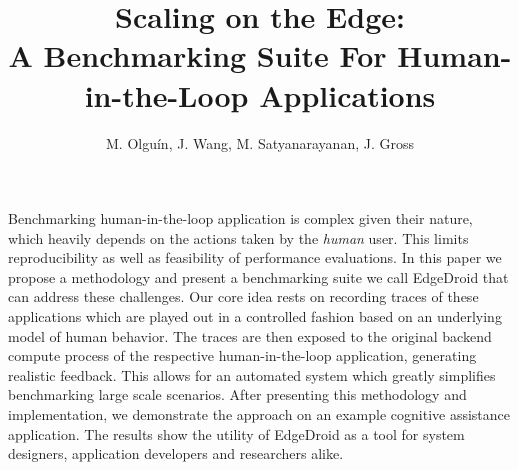 \documentclass[portrait, a1]{KTHEEposter}
\begin{document}
    
    \title{\LARGE\bfseries Scaling on the Edge:\\A Benchmarking Suite For Human-in-the-Loop Applications}
    
    \author{\Large M. Olguín, J. Wang, M. Satyanarayanan, J. Gross}
    \maketitle
    
    \begin{pcolumns}[3]
        \begin{pcolumn}[2]
            \begin{pframe}
                Benchmarking human-in-the-loop application is complex given their nature, which heavily depends on the actions taken by the \emph{human} user.
                This limits reproducibility as well as feasibility of performance evaluations.
                In this paper we propose a methodology and present a benchmarking suite we call EdgeDroid  that can address these challenges.
                Our core idea rests on recording traces of these applications which are played out in a controlled fashion based on an underlying model of human behavior.
                The traces are then exposed to the original backend compute process of the respective human-in-the-loop application, generating realistic feedback.
                This allows for an automated system which greatly simplifies benchmarking large scale scenarios.
                After presenting this methodology and implementation, we demonstrate the approach on an example cognitive assistance application.
                The results show the utility of EdgeDroid as a tool for system designers, application developers and researchers alike.
            \end{pframe}
        \end{pcolumn}
    \end{pcolumns}
    
\end{document}
